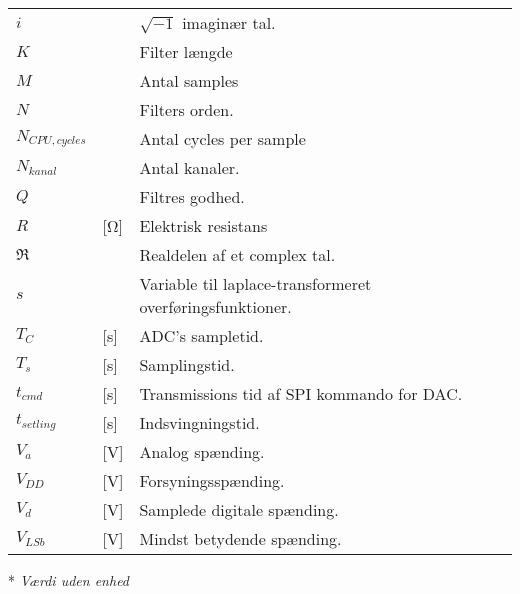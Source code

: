 \begin{table}[h!]
\begin{threeparttable}
\begin{tabular}{l l l}
$i$\tnote{*}		&					& $\sqrt{-1}$ imaginær tal.	\\
$K$ & & Filter længde\\
$M$\tnote{*}        &                   & Antal samples \\ 
$N$\tnote{*}        &                   & Filters orden.\\
$N_{CPU,cycles}$ & & Antal cycles per sample \\
$N_{kanal}$\tnote{*} & & Antal kanaler. \\
$Q$\tnote{*}        &                   & Filtres godhed.\\
$R$ & [\si{\ohm}] & Elektrisk resistans \\
$\Re$\tnote{*}		&					& Realdelen af et complex tal.	\\
$s$\tnote{*}		&					& Variable til laplace-transformeret overføringsfunktioner.\\
$T_C$ &[\si{\second}] & ADC's sampletid. \\
$T_s$ & [\si{\second}] & Samplingstid. \\
$t_{cmd}$ & [\si{\second}] & Transmissions tid af SPI kommando for DAC.\\
$t_{setling}$ &[\si{\second}] & Indsvingningstid. \\
$V_a$ &[\si{\volt}] & Analog spænding. \\
$V_{DD}$ & [\si{\volt}] & Forsyningsspænding. \\
$V_d$ & [\si{\volt}]& Samplede digitale spænding.\\
$V_{LSb}$ & [\si{\volt}] & Mindst betydende spænding. \\
\bottomrule
\end{tabular}
\begin{tablenotes}
\item[*] \textit{Værdi uden enhed}
\end{tablenotes}
\end{threeparttable}
\end{table}




